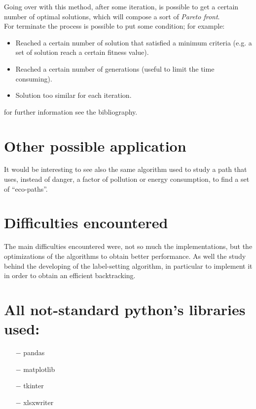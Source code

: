 \documentclass[a4paper,11pt]{report}
\begin{document}
Going over with this method, after some iteration, is possible to get a certain number of optimal solutions, which will compose a sort of \textit{Pareto front}.\\
For terminate the process is possible to put some condition; for example:
\begin{itemize}
	\item Reached a certain number of solution that satisfied a minimum criteria (e.g. a set of solution reach a certain fitness value).
	\item Reached a certain number of generations (useful to limit the time consuming).
	\item  Solution too similar for each iteration.
\end{itemize}


for further information see the bibliography.

\section{Other possible application}
It would be interesting to see also the same algorithm used to study a path that uses, instead of danger, a factor of pollution or energy consumption, to find a set of ``eco-paths''.


\section{Difficulties encountered}
The main difficulties encountered were, not so much the implementations, but the optimizations of the algorithms to obtain better performance. As well the study behind the developing of the label-setting algorithm, in particular to implement it in order to obtain an efficient backtracking. 


\section{All not-standard python's libraries used:}
\begin{itemize}
	\item[$-$] pandas
	\item[$-$] matplotlib
	\item[$-$] tkinter
	\item[$-$] xlsxwriter
\end{itemize}
\nocite{*}
\end{document}

